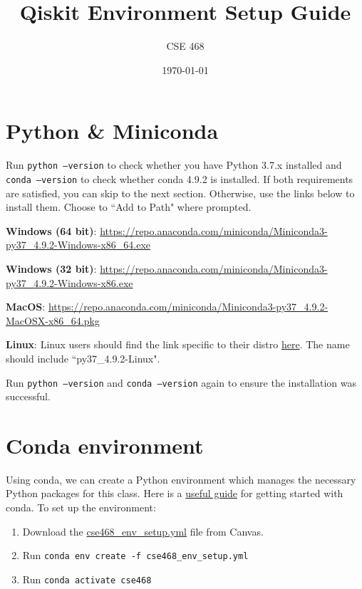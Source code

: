 \documentclass[12pt]{article}
\title{Qiskit Environment Setup Guide}
\author{CSE 468}
\date{\today}
\begin{document}

\section{Python \& Miniconda}

Run \texttt{python --version} to check whether you have Python 3.7.x installed and \texttt{conda --version} to check whether conda 4.9.2 is installed. If both requirements are satisfied, you can skip to the next section. Otherwise, use the links below to install them. Choose to ``Add to Path" where prompted. \newline

\textbf{Windows (64 bit)}:
\href{https://repo.anaconda.com/miniconda/Miniconda3-py37_4.9.2-Windows-x86_64.exe}{https://repo.anaconda.com/miniconda/Miniconda3-py37\_4.9.2-Windows-x86\_64.exe}\newline

\textbf{Windows (32 bit)}: \href{https://repo.anaconda.com/miniconda/Miniconda3-py37_4.9.2-Windows-x86.exe}{https://repo.anaconda.com/miniconda/Miniconda3-py37\_4.9.2-Windows-x86.exe}\newline

\textbf{MacOS}:
\href{https://repo.anaconda.com/miniconda/Miniconda3-py37_4.9.2-MacOSX-x86_64.pkg}{https://repo.anaconda.com/miniconda/Miniconda3-py37\_4.9.2-MacOSX-x86\_64.pkg}\newline

\textbf{Linux}:
Linux users should find the link specific to their distro \href{https://repo.anaconda.com/miniconda/}{here}. The name should include ``py37\_4.9.2-Linux". \newline

Run \texttt{python --version} and \texttt{conda --version} again to ensure the installation was successful.


\section{Conda environment}
Using conda, we can create a Python environment which manages the necessary Python packages for this class. Here is a \href{https://docs.conda.io/projects/conda/en/latest/user-guide/getting-started.html}{useful guide} for getting started with conda. To set up the environment:
\begin{enumerate}
    \item Download the \href{FIXME}{cse468\_env\_setup.yml} file from Canvas.
    \item Run \texttt{conda env create -f cse468\_env\_setup.yml}
    \item Run \texttt{conda activate cse468}
\end{enumerate}
\end{document}
